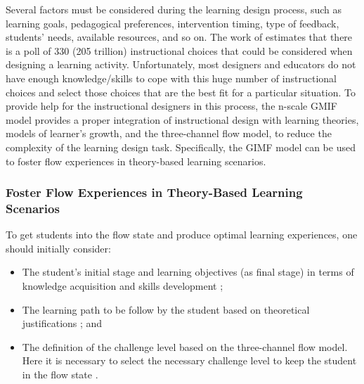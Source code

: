 Several factors must be considered during the learning design process, such as learning goals, pedagogical preferences, intervention timing, type of feedback, students’ needs, available resources, and so on.
The work of  estimates that there is a poll of 330 (205 trillion) instructional choices that could be considered when designing a learning activity.
Unfortunately, most designers and educators do not have enough knowledge/skills to cope with this huge number of instructional choices and select those choices that are the best fit for a particular situation.
To provide help for the instructional designers in this process, the n-scale GMIF model provides a proper integration of instructional design with learning theories, models of learner’s growth, and the three-channel flow model, to reduce the complexity of the learning design task.
Specifically, the GIMF model can be used to foster flow experiences in theory-based learning scenarios.

\subsubsection*{Foster Flow Experiences in Theory-Based Learning Scenarios}

To get students into the flow state and produce optimal learning experiences, one should initially consider: 

\begin{itemize}
\item The student's initial stage and learning objectives (as final stage) in terms of knowledge acquisition and skills development \cite{Anderson1982,RumelhartNorman1976};
\item The learning path to be follow by the student based on theoretical justifications \cite{IsotaniMizoguchiInabaIkeda2010,Romiszowski1981}; and 
\item The definition of the challenge level based on the three-channel flow model.
Here it is necessary to select the necessary challenge level to keep the student in the flow state \cite{Csikszentmihalyi2014,DMello2012}. 
\end{itemize}

